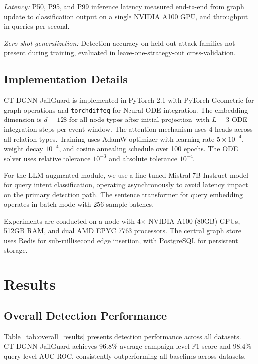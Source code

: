 \documentclass[journal]{IEEEtran}
\theoremstyle{plain}
\theoremstyle{definition}
\theoremstyle{remark}
\begin{document}
\textit{Latency:} P50, P95, and P99 inference latency measured end-to-end from graph update to classification output on a single NVIDIA A100 GPU, and throughput in queries per second.

\textit{Zero-shot generalization:} Detection accuracy on held-out attack families not present during training, evaluated in leave-one-strategy-out cross-validation.

\subsection{Implementation Details}

CT-DGNN-JailGuard is implemented in PyTorch 2.1 with PyTorch Geometric for graph operations and \texttt{torchdiffeq} for Neural ODE integration. The embedding dimension is $d = 128$ for all node types after initial projection, with $L = 3$ ODE integration steps per event window. The attention mechanism uses 4 heads across all relation types. Training uses AdamW optimizer with learning rate $5 \times 10^{-4}$, weight decay $10^{-4}$, and cosine annealing schedule over 100 epochs. The ODE solver uses relative tolerance $10^{-3}$ and absolute tolerance $10^{-4}$.

For the LLM-augmented module, we use a fine-tuned Mistral-7B-Instruct model for query intent classification, operating asynchronously to avoid latency impact on the primary detection path. The sentence transformer for query embedding operates in batch mode with 256-sample batches.

Experiments are conducted on a node with 4$\times$ NVIDIA A100 (80GB) GPUs, 512GB RAM, and dual AMD EPYC 7763 processors. The central graph store uses Redis for sub-millisecond edge insertion, with PostgreSQL for persistent storage.

\section{Results}
\label{sec:results}

\subsection{Overall Detection Performance}

Table~\ref{tab:overall_results} presents detection performance across all datasets. CT-DGNN-JailGuard achieves 96.8\% average campaign-level F1 score and 98.4\% query-level AUC-ROC, consistently outperforming all baselines across datasets.
\end{document}
